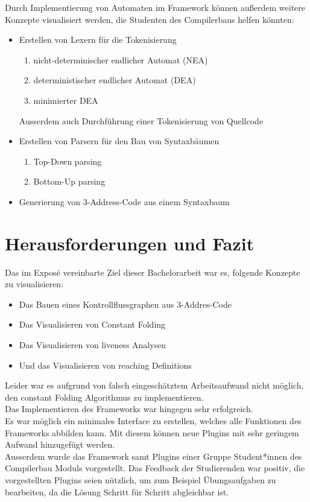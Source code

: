 Durch Implementierung von Automaten im Framework können außerdem weitere 
Konzepte visualisiert werden, die Studenten des Compilerbaus helfen könnten:
\begin{itemize}
  \item Erstellen von Lexern für die Tokenisierung
    \begin{enumerate}
      \item nicht-determinischer endlicher Automat (NEA)
      \item deterministischer endlicher Automat (DEA)
      \item minimierter DEA
    \end{enumerate}
    Ausserdem auch Durchführung einer Tokenisierung von Quellcode
  \item Erstellen von Parsern für den Bau von Syntaxbäumen
    \begin{enumerate}
      \item Top-Down parsing
      \item Bottom-Up parsing
    \end{enumerate}
  \item Generierung von 3-Address-Code aus einem Syntaxbaum
\end{itemize}



\newpage
\section{Herausforderungen und Fazit}
Das im Exposé vereinbarte Ziel dieser Bachelorarbeit war es, folgende Konzepte zu visualisieren:
\begin{itemize}
  \item Das Bauen eines Kontrollflussgraphen aus 3-Addres-Code
  \item Das Visualisieren von Constant Folding
  \item Das Visualisieren von liveness Analysen
  \item Und das Visualisieren von reaching Definitions
\end{itemize}

Leider war es aufgrund von falsch eingeschätztem Arbeitsaufwand nicht möglich, 
den constant Folding Algorithmus zu implementieren.\\

Das Implementieren des Frameworks war hingegen sehr erfolgreich.\\
Es war möglich ein minimales Interface zu erstellen, welches alle
Funktionen des Frameworks abbilden kann. Mit diesem können neue Plugins
mit sehr geringem Aufwand hinzugefügt werden.\\

Ausserdem wurde das Framework samt Plugins einer Gruppe 
Student*innen des Compilerbau Moduls vorgestellt.
Das Feedback der Studierenden war positiv, die vorgestellten Plugins
seien nützlich, um zum Beispiel Übungsaufgaben zu bearbeiten,
da die Lösung Schritt für Schritt abgleichbar ist.\\
